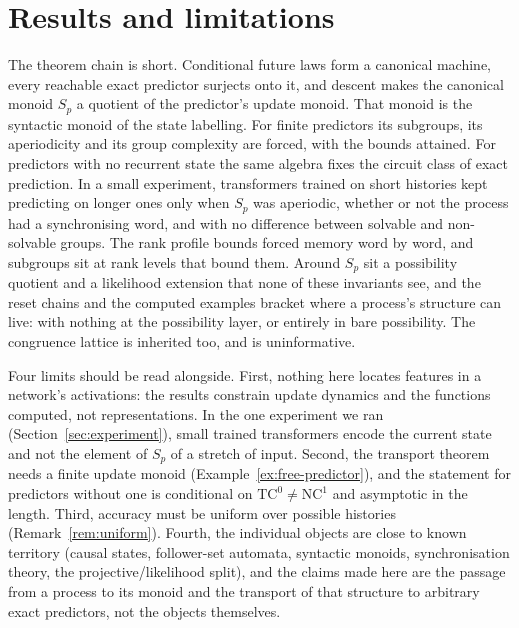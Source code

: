 \documentclass[10pt]{article}
\theoremstyle{definition}
\theoremstyle{remark}
\begin{document}
\section{Results and limitations}
\label{sec:results}

The theorem chain is short.  Conditional future laws form a canonical
machine, every reachable exact predictor surjects onto it, and
descent makes the canonical monoid $S_p$ a quotient of the
predictor's update monoid.  That monoid is the syntactic monoid of
the state labelling.  For finite predictors its subgroups, its
aperiodicity and its group complexity are forced, with the bounds
attained.  For predictors with no recurrent state the same algebra
fixes the circuit class of exact prediction.  In a small experiment,
transformers trained on short histories kept predicting on longer
ones only when $S_p$ was aperiodic, whether or not the process had a
synchronising word, and with no difference between solvable and
non-solvable groups.  The rank profile bounds
forced memory word by word, and subgroups sit at rank levels that
bound them.  Around $S_p$ sit a possibility quotient and a likelihood
extension that none of these invariants see, and the reset chains and
the computed examples bracket where a process's structure can live:
with nothing at the possibility layer, or entirely in bare
possibility.  The
congruence lattice is inherited too, and is uninformative.

Four limits should be read alongside.  First, nothing here locates
features in a network's activations: the results constrain update
dynamics and the functions computed, not representations.  In the one
experiment we ran (Section~\ref{sec:experiment}), small trained
transformers encode the current state and not the element of $S_p$
of a stretch of input.
Second, the transport theorem needs a finite update monoid
(Example~\ref{ex:free-predictor}), and the statement for predictors
without one is conditional on $\mathrm{TC}^0\ne\mathrm{NC}^1$ and
asymptotic in the length.  Third, accuracy must be uniform over
possible histories (Remark~\ref{rem:uniform}).  Fourth, the
individual objects are close to known territory (causal states,
follower-set automata, syntactic monoids, synchronisation theory, the
projective/likelihood split), and the claims made here are the
passage from a process to its monoid and the transport of that
structure to arbitrary exact predictors, not the objects themselves.
\end{document}
